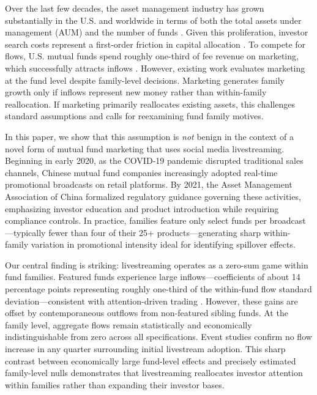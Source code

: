\documentclass[12pt]{article}
\begin{document}
Over the last few decades, the asset management industry has grown substantially in the U.S. and worldwide in terms of both the total assets under management (AUM) and the number of funds \citep{pastor2015scale,ici2025:ch1}. Given this proliferation, investor search costs represent a first-order friction in capital allocation \citep{hortacsu2004,huang2007participation,roussanov2021marketing}. To compete for flows, U.S. mutual funds spend roughly one-third of fee revenue on marketing, which successfully attracts inflows \citep{sirri1998costly,huang2007participation,gallaher2008advertising,christofferson2013what}. However, existing work evaluates marketing at the fund level despite family-level decisions. Marketing generates family growth only if inflows represent new money rather than within-family reallocation. If marketing primarily reallocates existing assets, this challenges standard assumptions and calls for reexamining fund family motives.

In this paper, we show that this assumption is \textit{not} benign in the context of a novel form of mutual fund marketing that uses social media livestreaming. Beginning in early 2020, as the COVID‑19 pandemic disrupted traditional sales channels, Chinese mutual fund companies increasingly adopted real-time promotional broadcasts on retail platforms. By 2021, the Asset Management Association of China formalized regulatory guidance governing these activities, emphasizing investor education and product introduction while requiring compliance controls. In practice, families feature only select funds per broadcast—typically fewer than four of their 25+ products—generating sharp within-family variation in promotional intensity ideal for identifying spillover effects.

Our central finding is striking: livestreaming operates as a zero-sum game within fund families. Featured funds experience large inflows—coefficients of about 14 percentage points representing roughly one-third of the within-fund flow standard deviation—consistent with attention-driven trading \citep{barber2008glitters}. However, these gains are offset by contemporaneous outflows from non-featured sibling funds. At the family level, aggregate flows remain statistically and economically indistinguishable from zero across all specifications. Event studies confirm no flow increase in any quarter surrounding initial livestream adoption. This sharp contrast between economically large fund-level effects and precisely estimated family-level nulls demonstrates that livestreaming reallocates investor attention within families rather than expanding their investor bases.
\end{document}
